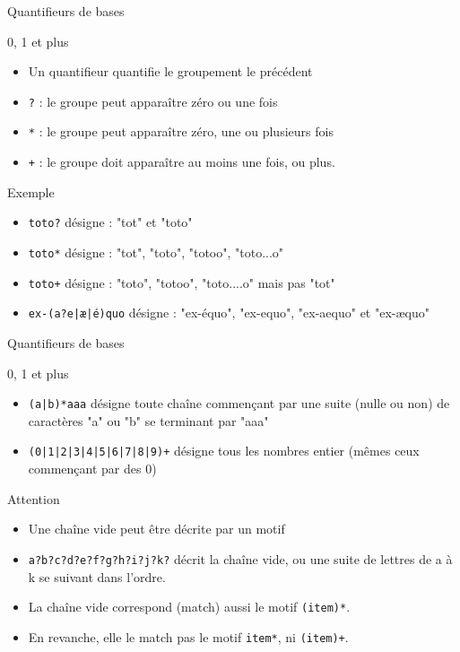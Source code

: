 \def\ftitle{Quantifieurs de bases}
\def\blocktitle{0, 1 et plus}
\begin{frame}[containsverbatim]{\ftitle}
\begin{block}{\blocktitle}
\begin{itemize}
\item Un quantifieur quantifie le groupement le précédent
\item \verb!?! : le groupe peut apparaître zéro ou une fois
\item \verb!*! : le groupe peut apparaître zéro, une ou plusieurs fois
\item \verb!+! : le groupe doit apparaître au moins une fois, ou plus. 
\end{itemize}
\end{block}


\def\blocktitle{Exemple}
\begin{block}{\blocktitle}
\begin{itemize}
\item \verb!toto?! désigne : "tot" et "toto"
\item \verb!toto*! désigne : "tot", "toto", "totoo", "toto...o"
\item \verb!toto+! désigne : "toto", "totoo", "toto....o" mais pas "tot"
\item \verb!ex-(a?e|æ|é)quo! désigne : "ex-équo", "ex-equo", "ex-aequo" et "ex-æquo"
\end{itemize}
\end{block}

\end{frame}

\begin{frame}[containsverbatim]{\ftitle}
\begin{block}{\blocktitle}
\begin{itemize}
\item \verb!(a|b)*aaa! désigne toute chaîne commençant par une suite (nulle ou non) de caractères "a" ou "b" se terminant par "aaa"
\item \verb!(0|1|2|3|4|5|6|7|8|9)+! désigne tous les nombres entier (mêmes ceux commençant par des 0)
\end{itemize}
\end{block}

\def\blocktitle{Attention}
\begin{alertblock}{\blocktitle}
\begin{itemize}
\item Une chaîne vide peut être décrite par un motif
\item \verb!a?b?c?d?e?f?g?h?i?j?k?! décrit la chaîne vide, ou une suite de lettres de a à k se suivant dans l'ordre.
\item La chaîne vide correspond (match) aussi le motif \verb!(item)*!.
\item En revanche, elle le match pas le motif \verb!item*!, ni \verb!(item)+!.
\end{itemize}
\end{alertblock}
\end{frame}

